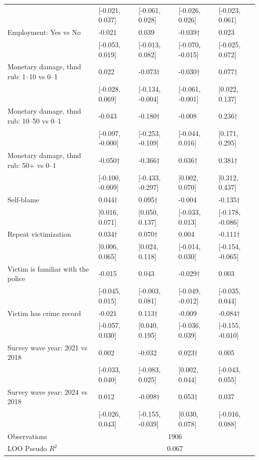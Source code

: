 \begin{tabular}[t]{lllll}
 & {}[-0.021, 0.037] & {}[-0.061, 0.028] & {}[-0.026, 0.026] & {}[-0.023, 0.061]\\
Employment: Yes vs No & -0.021 & 0.039 & -0.039$\dagger$ & 0.023\\
 & {}[-0.053, 0.019] & {}[-0.013, 0.082] & {}[-0.070, -0.015] & {}[-0.025, 0.072]\\
Monetary damage, thnd rub:  1–10 vs 0–1 & 0.022 & -0.073$\dagger$ & -0.030$\dagger$ & 0.077$\dagger$\\
 & {}[-0.028, 0.069] & {}[-0.134, -0.004] & {}[-0.061, -0.001] & {}[0.022, 0.137]\\
Monetary damage, thnd rub:  10–50 vs 0–1 & -0.043 & -0.180$\dagger$ & -0.008 & 0.236$\dagger$\\
 & {}[-0.097, -0.000] & {}[-0.253, -0.109] & {}[-0.044, 0.016] & {}[0.171, 0.295]\\
Monetary damage, thnd rub:  50+ vs 0–1 & -0.050$\dagger$ & -0.366$\dagger$ & 0.036$\dagger$ & 0.381$\dagger$\\
 & {}[-0.100, -0.009] & {}[-0.433, -0.297] & {}[0.002, 0.070] & {}[0.312, 0.437]\\
Self-blame & 0.044$\dagger$ & 0.095$\dagger$ & -0.004 & -0.135$\dagger$\\
 & {}[0.016, 0.071] & {}[0.050, 0.137] & {}[-0.033, 0.013] & {}[-0.178, -0.086]\\
Repeat victimization & 0.034$\dagger$ & 0.070$\dagger$ & 0.004 & -0.111$\dagger$\\
 & {}[0.006, 0.065] & {}[0.024, 0.118] & {}[-0.014, 0.030] & {}[-0.154, -0.065]\\
Victim is familiar with the police & -0.015 & 0.043 & -0.029$\dagger$ & 0.003\\
 & {}[-0.045, 0.015] & {}[-0.003, 0.081] & {}[-0.049, -0.012] & {}[-0.035, 0.044]\\
Victim has crime record & -0.021 & 0.113$\dagger$ & -0.009 & -0.084$\dagger$\\
 & {}[-0.057, 0.030] & {}[0.040, 0.195] & {}[-0.036, 0.039] & {}[-0.155, -0.010]\\
Survey wave year: 2021 vs 2018 & 0.002 & -0.032 & 0.023$\dagger$ & 0.005\\
 & {}[-0.033, 0.040] & {}[-0.083, 0.025] & {}[0.002, 0.044] & {}[-0.043, 0.055]\\
Survey wave year: 2024 vs 2018 & 0.012 & -0.098$\dagger$ & 0.053$\dagger$ & 0.037\\
 & {}[-0.026, 0.043] & {}[-0.155, -0.039] & {}[0.030, 0.078] & {}[-0.016, 0.088]\\
\midrule
Observations & \multicolumn{4}{c}{1906} &  &  & \\
LOO Pseudo $R^2$ & \multicolumn{4}{c}{0.067} &  &  & \\
\bottomrule
\end{tabular}